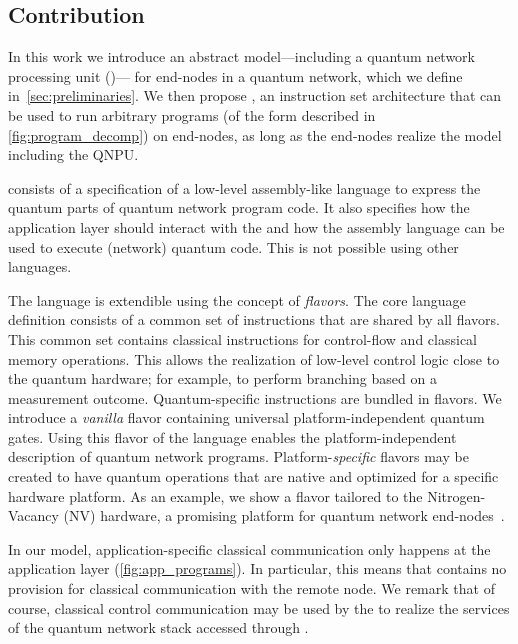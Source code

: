 \subsection{Contribution}
In this work we introduce an abstract model---including a quantum network processing unit (\QNPU)--- for end-nodes in a quantum network, which we define in~\cref{sec:preliminaries}.
We then propose \netqasm, an instruction set architecture that can be used to run arbitrary programs (of the form described in \cref{fig:program_decomp}) on end-nodes, as long as the end-nodes realize the model including the QNPU.

\netqasm consists of a specification of a low-level assembly-like language to express the quantum parts of quantum network program code.
It also specifies how the application layer should interact with the \QNPU and how the assembly language can be used to execute (network) quantum code.
This is not possible using other \qasm languages.

The \netqasm language is extendible using the concept of \textit{flavors}.
The core language definition consists of a common set of instructions that are shared by all flavors.
This common set contains classical instructions for control-flow and classical memory operations.
This allows the realization of low-level control logic close to the quantum hardware;
for example, to perform branching based on a measurement outcome.
Quantum-specific instructions are bundled in flavors.
We introduce a \textit{vanilla} flavor containing universal platform-independent quantum gates.
Using this flavor of the \netqasm language enables the platform-independent description of quantum network programs.
Platform-\textit{specific} flavors may be created to have quantum operations that are native and optimized for a specific hardware platform.
As an example, we show a flavor tailored to the Nitrogen-Vacancy (NV) hardware, a promising platform for quantum network end-nodes~\cite{Taminiau2014, hanson2021realization}.

In our model, application-specific classical communication only happens at the application layer (\cref{fig:app_programs}).
In particular, this means that \netqasm contains no provision for classical communication with the remote node.
We remark that of course, classical control communication may be used by the \QNPU to realize the services of the quantum network stack accessed through \netqasm.

